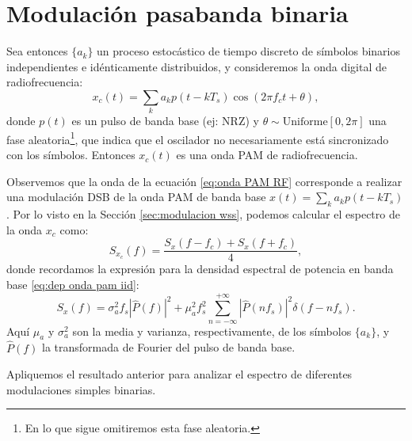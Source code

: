 \section{Modulación pasabanda binaria}

Sea entonces $\{a_k\}$ un proceso estocástico de tiempo discreto de símbolos binarios independientes e idénticamente distribuidos, y consideremos la onda digital de radiofrecuencia:
\begin{equation}\label{eq:onda PAM RF}
x_c(t) = \sum_k a_k p(t-kT_s) \cos(2\pi f_c t + \theta),    
\end{equation}
donde $p(t)$ es un pulso de banda base (ej: NRZ) y $\theta\sim\textrm{Uniforme}[0,2\pi]$ una fase aleatoria\footnote{En lo que sigue omitiremos esta fase aleatoria.}, que indica que el oscilador no necesariamente está sincronizado con los símbolos. Entonces $x_c(t)$ es una onda PAM de radiofrecuencia.

Observemos que la onda de la ecuación \eqref{eq:onda PAM RF} corresponde a realizar una modulación DSB de la onda PAM de banda base $x(t)=\sum_k a_k p(t-kT_s)$. Por lo visto en la Sección \ref{sec:modulacion wss}, podemos calcular el espectro de la onda $x_c$ como:
\begin{equation}\label{eq:dep PAM RF}
    S_{x_c}(f) = \frac{S_x(f-f_c) + S_x(f+f_c)}{4},
\end{equation}
donde recordamos la expresión para la densidad espectral de potencia en banda base \eqref{eq:dep onda pam iid}:
\begin{equation*}
S_x(f) = \sigma_a^2 f_s |\hat{P}(f)|^2 + \mu_a^2 f_s^2 \sum_{n=-\infty}^{+\infty} |\hat{P}(n f_s)|^2\delta(f-nf_s).    
\end{equation*}
Aquí $\mu_a$ y $\sigma_a^2$ son la media y varianza, respectivamente, de los símbolos $\{a_k\}$, y $\hat{P}(f)$ la transformada de Fourier del pulso de banda base.

Apliquemos el resultado anterior para analizar el espectro de diferentes modulaciones simples binarias.

